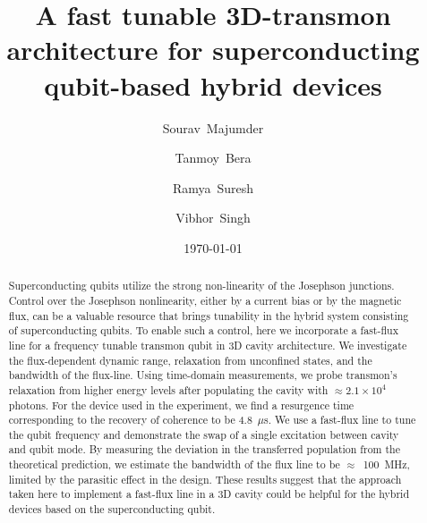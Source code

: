 \documentclass[a4paper, amsfonts, amssymb, amsmath, reprint,showkeys,nofootinbib,superscriptaddress]{revtex4-2}
\begin{document}
\title{A fast tunable 3D-transmon architecture for superconducting qubit-based hybrid devices}

\author{Sourav~Majumder}

\author{Tanmoy~Bera}

\author{Ramya~Suresh}

\author{Vibhor~Singh}




\date{\today}





\begin{abstract}

Superconducting qubits utilize the strong non-linearity of the
Josephson junctions. Control over the Josephson nonlinearity, 
either by a current bias or by the magnetic flux, can be a 
valuable resource that brings tunability in the hybrid system 
consisting of superconducting qubits.
%
To enable such a control, here we incorporate a fast-flux line for 
a frequency tunable transmon qubit in 3D cavity architecture. 
%
We investigate the flux-dependent dynamic range, relaxation from
unconfined states, and the bandwidth of the flux-line. 
Using time-domain measurements, we probe transmon's relaxation from 
higher energy levels after populating the cavity with 
$\approx 2.1\times10^4$ photons. For the device used in the 
experiment, we find a resurgence time corresponding to the 
recovery of coherence to be 4.8~$\mu$s.
%
We use a fast-flux line to tune the qubit frequency and demonstrate 
the swap of a single excitation between cavity and qubit mode. 
By measuring the deviation in the transferred population from 
the theoretical prediction, we estimate the bandwidth of the flux line to be 
$\approx$~100~MHz, limited by the parasitic effect in the design.
These results suggest that the approach taken here to implement a 
fast-flux line in a 3D cavity could be helpful for the hybrid devices 
based on the superconducting qubit.

\end{abstract}

\end{document}
